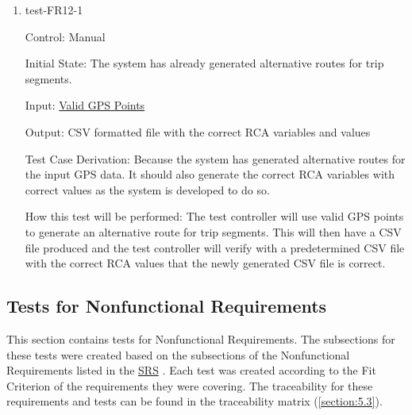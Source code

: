 \documentclass[12pt, titlepage]{article}
\begin{document}
\begin{enumerate}

\begin{comment}
\item{test-FR12-1\\} \label{test-FR12-1}

Control: Manual 
					
Initial State: Control has already generated alternative routes for trip segments in SHP format with a digital road/pedestrian network and is ready to move forward. 
					
Input:  alternative routes in CSV format 
					
Output: Each RCA variable with assigned variables 

Test Case Derivation: 
					
How this test will be performed: 
\end{comment}

\item{test-FR12-1\\} \label{test-FR12-1}

Control: Manual 
					
Initial State: The system has already generated alternative routes for trip segments.
					
Input: \href{https://github.com/paezha/PyERT-BLACK/blob/rev0-test/quarto-example/data/sample-gps/sample-gps-1.csv}{Valid GPS Points}
					
Output: CSV formatted file with the correct RCA variables and values

Test Case Derivation: Because the system has generated alternative routes for the input GPS data. It should also generate the correct RCA variables with correct values as the system is developed to do so.
					
How this test will be performed: The test controller will use valid GPS points to generate an alternative route for trip segments. This will then have a CSV file produced and the test controller will verify with a predetermined CSV file with the correct RCA values that the newly generated CSV file is correct.

\end{enumerate}

\subsection{Tests for Nonfunctional Requirements}
This section contains tests for Nonfunctional Requirements. The subsections for these tests were created based on the subsections of the Nonfunctional Requirements listed in the \href{https://github.com/paezha/PyERT-BLACK/blob/main/docs/SRS/SRS.pdf}{SRS} \citep{SRS}. Each test was created according to the Fit Criterion of the requirements they were covering. The traceability for these requirements and tests can be found in the traceability matrix (\ref{section:5.3}). 
\end{document}
